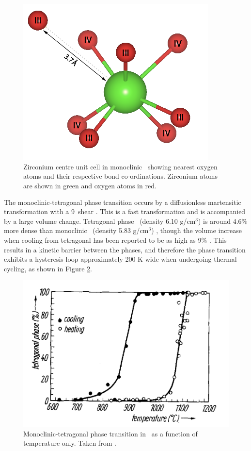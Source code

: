 \begin{figure}[ht] %
\centering
\includegraphics[height=8.5cm]{images/mono_zr_centre.png}
\caption{Zirconium centre unit cell in monoclinic \zirconia\ showing nearest oxygen atoms and their respective bond co-ordinations. Zirconium atoms are shown in green and oxygen atoms in red.}
\label{figure:monoschottky}
\end{figure}

The monoclinic-tetragonal phase transition occurs by a diffusionless martensitic transformation with a 9\textdegree\ shear \cite{Subbarao1974}. This is a fast transformation and is accompanied by a large volume change. Tetragonal phase \zirconia\ (density 6.10 g/cm$^{3}$) is around 4.6\% more dense than monoclinic \zirconia\ (density 5.83 g/cm$^{3}$) \cite{McCullough2002}, though the volume increase when cooling from tetragonal has been reported to be as high as 9\% \cite{Gupta1977}. This results in a kinetic barrier between the phases, and therefore the phase transition exhibits a hysteresis loop approximately 200 K wide when undergoing thermal cycling, as shown in Figure \ref{figure:hysteresis_monotet}.

\begin{figure}[ht] %
\centering
\includegraphics[width=12cm]{images/hysteresis_monotet.png}
\caption[Monoclinic-tetragonal phase transition in \zirconia\ as a function of temperature only.]{Monoclinic-tetragonal phase transition in \zirconia\ as a function of temperature only. Taken from \cite{WOLTEN1963}.}
\label{figure:hysteresis_monotet}
\end{figure}

